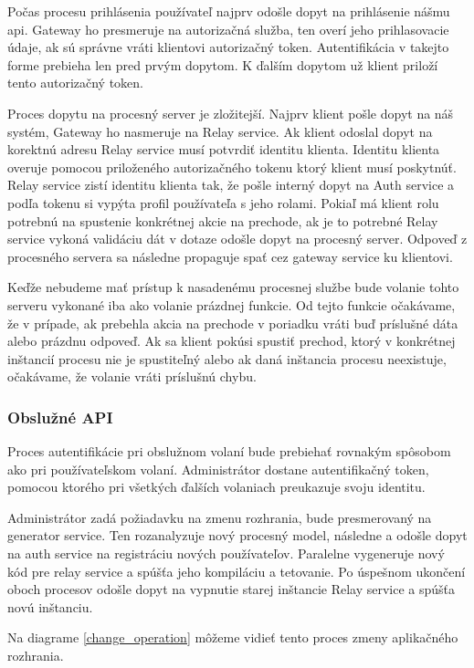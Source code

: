 Počas procesu prihlásenia používateľ najprv odošle dopyt na prihlásenie nášmu \acrshort{api}.  Gateway ho presmeruje na autorizačná služba, ten overí jeho prihlasovacie údaje, ak sú správne vráti klientovi autorizačný token. Autentifikácia v takejto forme prebieha len pred prvým dopytom. K ďalším dopytom už klient priloží tento autorizačný token. 

Proces dopytu na procesný server je zložitejší. Najprv klient pošle dopyt na náš systém, Gateway ho nasmeruje na Relay service. Ak klient odoslal dopyt na korektnú adresu Relay service musí potvrdiť identitu klienta. Identitu klienta overuje pomocou priloženého autorizačného tokenu ktorý klient musí poskytnúť. Relay service zistí identitu klienta tak, že pošle interný dopyt na  Auth service a podľa tokenu si vypýta profil používateľa s jeho rolami.  Pokiaľ má klient rolu potrebnú na spustenie konkrétnej akcie na prechode, ak je to potrebné Relay service vykoná validáciu dát  v dotaze odošle dopyt na procesný server.  Odpoveď z procesného servera sa následne propaguje spať cez gateway service ku klientovi.
 
Keďže nebudeme mať prístup k nasadenému procesnej službe bude volanie tohto serveru vykonané iba ako volanie prázdnej funkcie. Od tejto funkcie očakávame, že v prípade, ak prebehla akcia na prechode v poriadku vráti buď príslušné dáta alebo prázdnu odpoveď.  Ak sa klient pokúsi spustiť prechod, ktorý v konkrétnej inštancií procesu nie je spustiteľný alebo ak daná inštancia procesu neexistuje, očakávame, že volanie vráti príslušnú chybu. 

\subsubsection{Obslužné API}
Proces autentifikácie pri obslužnom volaní bude prebiehať rovnakým spôsobom ako pri  používateľskom volaní. Administrátor dostane autentifikačný token, pomocou ktorého pri všetkých ďalších volaniach preukazuje svoju identitu.

Administrátor zadá požiadavku na zmenu rozhrania, bude presmerovaný na generator service. Ten rozanalyzuje nový procesný model, následne a odošle dopyt na auth service na registráciu nových používateľov. Paralelne vygeneruje nový kód pre relay service a spúšťa jeho kompiláciu a tetovanie. Po úspešnom ukončení oboch procesov odošle dopyt na vypnutie starej inštancie Relay service a spúšťa novú inštanciu.

Na diagrame \ref{change_operation} môžeme vidieť tento proces zmeny aplikačného rozhrania.

